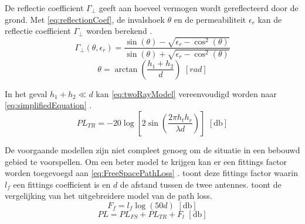 De reflectie coefficient $\Gamma_\bot$ geeft aan hoeveel vermogen wordt gereflecteerd door de grond. Met \cref{eq:reflectionCoef}, de invalshoek $\theta$ en de permeabiliteit $\epsilon_r$ kan de reflectie coefficient $\Gamma_\bot$ worden berekend \cite{bacco2014uavs,sommer2012applicability}.
\begin{equation}\label{eq:reflectionCoef}
    \Gamma_\bot\left(\theta, \epsilon_r\right)=\frac{\sin\left(\theta\right)-\sqrt{\epsilon_r-\cos^2\left(\theta\right)}}{\sin\left(\theta\right)+\sqrt{\epsilon_r-\cos^2\left(\theta\right)}}
\end{equation}
\begin{equation}
    \theta=\arctan\left(\frac{h_1+h_2}{d}\right)\,\,\unit{\left[rad\right]}
\end{equation}

In het geval $h_1+h_2\ll d$ kan \cref{eq:twoRayModel} vereenvoudigd worden naar \cref{eq:simplifiedEquation} \cite{brini2019system}.
\begin{equation}\label{eq:simplifiedEquation}
    PL_{TR}=-20\log\left[2\sin\left(\frac{2\pi h_th_r}{\lambda d}\right)\right] \,\,\left[\unit{\decibel}\right]
\end{equation}

De voorgaande modellen zijn niet compleet genoeg om de situatie in een bebouwd gebied te voorspellen. Om een beter model te krijgen kan er een fittings factor worden toegevoegd aan \cref{eq:FreeSpacePathLoss} \cite[24]{brini2019system}.  toont deze fittings factor waarin \(l_f\) een fittings coefficient is en $d$ de afstand tussen de twee antennes.  toont de vergelijking van het uitgebreidere model van de path loss.
\begin{equation} \label{eq:fittingFactor}
    F_f=l_f\log(50d) \,\,\left[\unit{\decibel}\right]
\end{equation}
\begin{equation}\label{eq:calcPathLoss}
    PL= PL_{FS}+PL_{TR}+F_l \,\,\left[\unit{\decibel}\right]
\end{equation}


